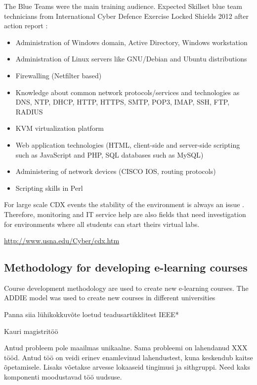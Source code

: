 The Blue Teams were the main training audience.
Expected Skillset blue team technicians from International Cyber Defence Exercise Locked Shields 2012 after action report \citep{website:NATO_CCD_COE}:
\begin{itemize}
\item Administration of Windows domain, Active Directory, Windows workstation
\item Administration of Linux servers like GNU/Debian and Ubuntu distributions
\item Firewalling (Netfilter based)
\item Knowledge about common network protocols/services and technologies as \gls{DNS}, \gls{NTP}, \gls{DHCP}, \gls{HTTP}, \gls{HTTPS}, \gls{SMTP}, \gls{POP3}, \gls{IMAP}, \gls{SSH}, \gls{FTP}, \gls{RADIUS}
\item \gls{KVM} virtualization platform
\item Web application technologies (\gls{HTML}, client-side and server-side scripting
such as JavaScript and \gls{PHP}, \gls{SQL} databases such as \gls{MySQL})
\item Administering of network devices (CISCO IOS, routing protocols)
\item Scripting skills in Perl
\end{itemize}

For large scale \gls{CDX} events the stability of the environment is always an issue \citep{website:NATO_CCD_COE,schepens_CDX}. Therefore, monitoring and IT service help are also fields that need investigation for environments where all students can start theirs virtual labs.

\url{http://www.usna.edu/Cyber/cdx.htm}


\subsection{Methodology for developing e-learning courses}

Course development methodology are used to create new e-learning courses. The \gls{ADDIE} model was used to create new courses in different universities \citep{skrinarova2011learning,kode2012integrative} 

Panna siia lühikokkuvõte loetud teadusartikklitest IEEE*

Kauri magistritöö

Antud probleem pole maailmas unikaalne. Sama probleemi on lahendanud XXX tööd. Antud töö on veidi erinev enamlevinud lahendustest, kuna keskendub kaitse õpetamisele. Lisaks võetakse arvesse lokaaseid tingimusi ja sithgruppi. Need kaks komponenti moodustavad töö uudsuse.

